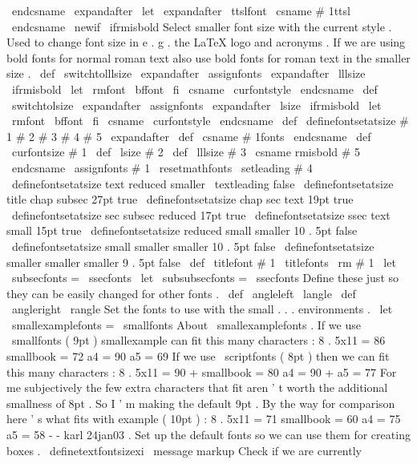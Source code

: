 {{{{\
endcsname
\
expandafter
\
let
\
expandafter
\
ttslfont
\
csname
#
1ttsl
\
endcsname
}
\
newif
\
ifrmisbold
%
Select
smaller
font
size
with
the
current
style
.
Used
to
change
font
size
%
in
e
.
g
.
the
LaTeX
logo
and
acronyms
.
If
we
are
using
bold
fonts
for
%
normal
roman
text
also
use
bold
fonts
for
roman
text
in
the
smaller
size
.
\
def
\
switchtolllsize
{
%
\
expandafter
\
assignfonts
\
expandafter
{
\
lllsize
}
%
\
ifrmisbold
\
let
\
rmfont
\
bffont
\
fi
\
csname
\
curfontstyle
\
endcsname
}
%
\
def
\
switchtolsize
{
%
\
expandafter
\
assignfonts
\
expandafter
{
\
lsize
}
%
\
ifrmisbold
\
let
\
rmfont
\
bffont
\
fi
\
csname
\
curfontstyle
\
endcsname
}
%
\
def
\
definefontsetatsize
#
1
#
2
#
3
#
4
#
5
{
%
\
expandafter
\
def
\
csname
#
1fonts
\
endcsname
{
%
\
def
\
curfontsize
{
#
1
}
%
\
def
\
lsize
{
#
2
}
\
def
\
lllsize
{
#
3
}
%
\
csname
rmisbold
#
5
\
endcsname
\
assignfonts
{
#
1
}
%
\
resetmathfonts
\
setleading
{
#
4
}
%
}
}
\
definefontsetatsize
{
text
}
{
reduced
}
{
smaller
}
{
\
textleading
}
{
false
}
\
definefontsetatsize
{
title
}
{
chap
}
{
subsec
}
{
27pt
}
{
true
}
\
definefontsetatsize
{
chap
}
{
sec
}
{
text
}
{
19pt
}
{
true
}
\
definefontsetatsize
{
sec
}
{
subsec
}
{
reduced
}
{
17pt
}
{
true
}
\
definefontsetatsize
{
ssec
}
{
text
}
{
small
}
{
15pt
}
{
true
}
\
definefontsetatsize
{
reduced
}
{
small
}
{
smaller
}
{
10
.
5pt
}
{
false
}
\
definefontsetatsize
{
small
}
{
smaller
}
{
smaller
}
{
10
.
5pt
}
{
false
}
\
definefontsetatsize
{
smaller
}
{
smaller
}
{
smaller
}
{
9
.
5pt
}
{
false
}
\
def
\
titlefont
#
1
{
{
\
titlefonts
\
rm
#
1
}
}
\
let
\
subsecfonts
=
\
ssecfonts
\
let
\
subsubsecfonts
=
\
ssecfonts
%
Define
these
just
so
they
can
be
easily
changed
for
other
fonts
.
\
def
\
angleleft
{
\
langle
}
\
def
\
angleright
{
\
rangle
}
%
Set
the
fonts
to
use
with
the
small
.
.
.
environments
.
\
let
\
smallexamplefonts
=
\
smallfonts
%
About
\
smallexamplefonts
.
If
we
use
\
smallfonts
(
9pt
)
smallexample
%
can
fit
this
many
characters
:
%
8
.
5x11
=
86
smallbook
=
72
a4
=
90
a5
=
69
%
If
we
use
\
scriptfonts
(
8pt
)
then
we
can
fit
this
many
characters
:
%
8
.
5x11
=
90
+
smallbook
=
80
a4
=
90
+
a5
=
77
%
For
me
subjectively
the
few
extra
characters
that
fit
aren
'
t
worth
%
the
additional
smallness
of
8pt
.
So
I
'
m
making
the
default
9pt
.
%
%
By
the
way
for
comparison
here
'
s
what
fits
with
example
(
10pt
)
:
%
8
.
5x11
=
71
smallbook
=
60
a4
=
75
a5
=
58
%
-
-
karl
24jan03
.
%
Set
up
the
default
fonts
so
we
can
use
them
for
creating
boxes
.
%
\
definetextfontsizexi
\
message
{
markup
}
%
Check
if
we
are
currently
}}}
